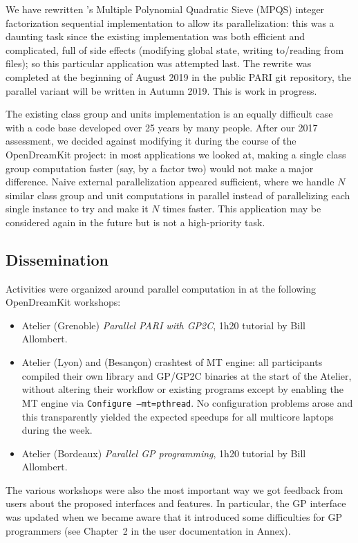 \documentclass{deliverablereport}
\begin{document}
We have rewritten \Pari's Multiple Polynomial Quadratic Sieve (MPQS) integer
factorization sequential implementation to allow its parallelization:
this was a daunting task since the existing implementation was both efficient
and complicated, full of side effects (modifying global state, writing
to/reading from files); so this particular application was attempted last.
The rewrite was completed at the beginning of August 2019 in the public
PARI git repository, the parallel variant will be written in Autumn 2019.
This is work in progress.

The existing class group and units implementation is an equally difficult
case with a code base developed over 25 years by many people. After our 2017
assessment, we decided against modifying it during the course of the
OpenDreamKit project: in most applications we looked at,
making a single class group computation faster (say, by a factor two)
would not make a major difference. Naive external
parallelization appeared sufficient, where we handle $N$ similar class group
and unit computations in parallel instead of parallelizing each single
instance to try and make it $N$ times faster. This application may be
considered again in the future but is not a high-priority task.

\subsection{Dissemination}

Activities were organized around parallel computation in \PariGP
at the following OpenDreamKit workshops:
\begin{itemize}
  \item Atelier  (Grenoble) \emph{Parallel PARI with GP2C},
  1h20 tutorial by Bill Allombert.
  \item Atelier  (Lyon) and  (Besançon)
  crashtest of MT engine: all participants compiled their own \Pari library and
  GP/GP2C  binaries at the start of the Atelier, without altering their
  workflow or existing programs except by enabling the MT engine via
  \texttt{Configure --mt=pthread}. No configuration problems arose and this
  transparently yielded the expected speedups for all multicore laptops during
  the week.

  \item Atelier  (Bordeaux) \emph{Parallel GP programming},
  1h20 tutorial by Bill Allombert.
\end{itemize}
The various workshops were also the most important way we got feedback from
users about the proposed interfaces and features. In particular, the GP
interface was updated when we became aware that it introduced some difficulties
for GP programmers (see Chapter~2 in the user documentation in Annex).
\end{document}
